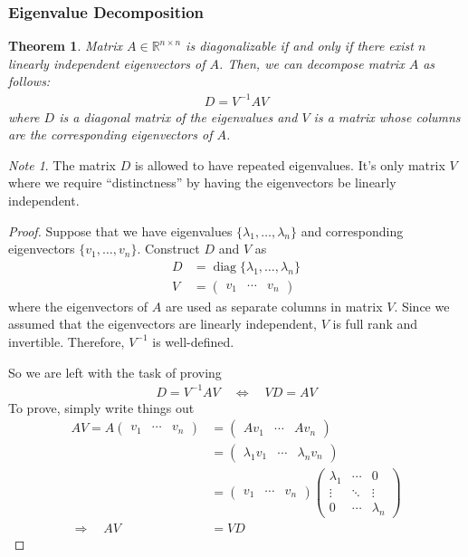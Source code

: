 \documentclass[12pt]{article}
\numberwithin{equation}{section} %
\theoremstyle{plain}
\newtheorem{thm}{Theorem}[section]
\theoremstyle{definition}
\theoremstyle{remark}
\newtheorem*{note}{Note}
\newcommand{\diag}{\operatorname{diag}}
\newcommand{\Rnn}{\mathbb{R}^{n\times n}}
\begin{document}
\clearpage
\subsubsection{Eigenvalue Decomposition}
\label{subsec:eigenvaluedecomp}

\begin{thm}
\label{thm:eigendecomp}
Matrix $A\in \Rnn$ is diagonalizable if and only if there exist $n$
linearly independent eigenvectors of $A$. Then, we can decompose matrix
$A$ as follows:
\begin{align*}
  D = V^{-1} A V
\end{align*}
where $D$ is a diagonal matrix of the eigenvalues and $V$ is a matrix
whose columns are the corresponding eigenvectors of $A$.
\end{thm}
\begin{note}
The matrix $D$ is allowed to have repeated eigenvalues. It's only matrix
$V$ where we require ``distinctness'' by having the eigenvectors be
linearly independent.
\end{note}

\begin{proof}
Suppose that we have eigenvalues $\{\lambda_1,\ldots,\lambda_n\}$ and
corresponding eigenvectors $\{v_1,\ldots,v_n\}$.
Construct $D$ and $V$ as
\begin{align*}
  D &= \diag\{\lambda_1, \ldots, \lambda_n\} \\
  V &=
  \begin{pmatrix}
    v_1 & \cdots & v_n
  \end{pmatrix}
\end{align*}
where the eigenvectors of $A$ are used as separate columns in matrix
$V$.  Since we assumed that the eigenvectors are linearly independent,
$V$ is full rank and invertible. Therefore, $V^{-1}$ is well-defined.

So we are left with the task of proving
\begin{align*}
  D = V^{-1} A V
  \quad\Leftrightarrow\quad
  VD = A V
\end{align*}
To prove, simply write things out
\begin{align*}
  AV = A
  \begin{pmatrix}
    v_1 & \cdots & v_n
  \end{pmatrix}
  &=
  \begin{pmatrix}
    Av_1 & \cdots & Av_n
  \end{pmatrix} \\
  &=
  \begin{pmatrix}
    \lambda_1 v_1 & \cdots & \lambda_n v_n
  \end{pmatrix} \\
  &=
  \begin{pmatrix}
    v_1 & \cdots & v_n
  \end{pmatrix}
  \begin{pmatrix}
    \lambda_1 & \cdots & 0 \\
    \vdots & \ddots & \vdots \\
    0 & \cdots & \lambda_n
  \end{pmatrix}\\
  \Rightarrow\quad
  AV &= VD
\end{align*}
\end{proof}
\end{document}
